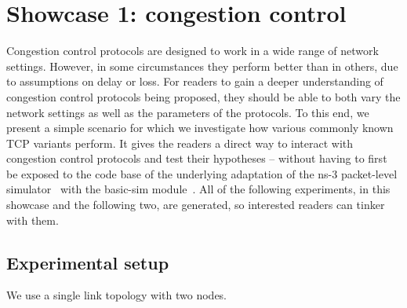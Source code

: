 \section{Showcase 1: congestion control}
\label{sec:congestion-control}

Congestion control protocols are designed to work in a wide range of network settings. However, in some circumstances they perform better than in others, \eg due to assumptions on delay or loss. For readers to gain a deeper understanding of congestion control protocols being proposed, they should be able to both vary the network settings as well as the parameters of the protocols. To this end, we present a simple scenario for which we investigate how various commonly known TCP variants perform. It gives the readers a direct way to interact with congestion control protocols and test their hypotheses -- without having to first be exposed to the code base of the underlying adaptation of the ns-3 packet-level simulator~\cite{ns3} with the basic-sim module~\cite{basic-sim}. All of the following experiments, in this showcase and the following two, are \sysname generated, so interested readers can tinker with them.

\subsection{Experimental setup}
 We use a single link topology with two nodes.

